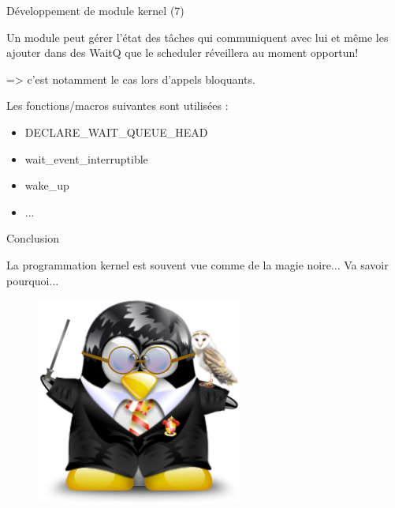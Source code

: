 \documentclass[12pt, t]{beamer}
\newcommand{\bi}{\begin{itemize}}
\newcommand{\ei}{\end{itemize}}
\begin{document}
\begin{frame}{Développement de module kernel (7)}

    \vspace{15pt}
    Un module peut gérer l'état des tâches qui communiquent avec lui et même
    les ajouter dans des WaitQ que le scheduler réveillera au moment opportun!

    \vspace{15pt}
    => c'est notamment le cas lors d'appels bloquants.

    {
        \vspace{15pt}
        Les fonctions/macros suivantes sont utilisées :
        \bi
        \item DECLARE\_WAIT\_QUEUE\_HEAD
        \item wait\_event\_interruptible
        \item wake\_up
        \item ...
        \ei
    }

\end{frame}

\begin{frame}{Conclusion}

    \centering
    \vspace{20pt}
    \LARGE{
        La programmation kernel est souvent vue comme de la magie noire... Va
        savoir pourquoi...

        \begin{figure}
            \centering
            \includegraphics[scale=0.35]{magic.png}
        \end{figure}
    }

\end{frame}
\end{document}

